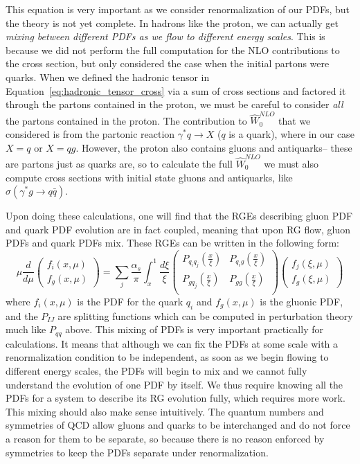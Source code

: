 \documentclass[11pt, oneside]{article}   	%
\theoremstyle{definition}
\begin{document}
This equation is very important as we consider renormalization of our PDFs, but the theory is not yet complete. In hadrons like the proton, we can 
actually get \textit{mixing between different PDFs as we flow to different energy scales}. This is because we did not perform the full 
computation for the NLO contributions to the cross section, but only considered the case when the initial partons were quarks. When we defined 
the hadronic tensor in Equation~\ref{eq:hadronic_tensor_cross} via a sum of cross sections and factored it through the partons contained in 
the proton, we must be careful to consider \textit{all} the partons contained in the proton. The contribution to $\hat{W}_0^{NLO}$ that we considered 
is from the partonic reaction $\gamma^* q\rightarrow X$ ($q$ is a quark), where in our case $X = q$ or $X = qg$. However, the proton also 
contains gluons and antiquarks-- these are partons just as quarks are, so to calculate the full $\hat{W}_0^{NLO}$ we must also compute cross 
sections with initial state gluons and antiquarks, like $\sigma(\gamma^* g\rightarrow q\bar q)$. 

Upon doing these calculations, one will find that the RGEs describing gluon PDF and quark PDF evolution are in fact coupled, meaning 
that upon RG flow, gluon PDFs and quark PDFs mix. These RGEs can be written in the following form:
\begin{equation}
	\mu\frac{d}{d\mu}\begin{pmatrix} f_i(x, \mu) \\ f_g(x, \mu)\end{pmatrix}
	= 
	\sum_j\frac{\alpha_s}{\pi}\int_x^1\frac{d\xi}{\xi}
	\begin{pmatrix}
		P_{q_i q_j}\left(\frac{x}{\xi}\right) & P_{q_i g}\left(\frac{x}{\xi}\right) \\
		P_{g q_j}\left(\frac{x}{\xi}\right) & P_{g g}\left(\frac{x}{\xi}\right) \\
	\end{pmatrix}
	\begin{pmatrix}
		f_j(\xi, \mu) \\ f_g(\xi, \mu)
	\end{pmatrix}
\end{equation}
where $f_i(x, \mu)$ is the PDF for the quark $q_i$ and $f_g(x, \mu)$ is the gluonic PDF, and the $P_{IJ}$ are splitting functions which can be 
computed in perturbation theory much like $P_{qq}$ above. This mixing of PDFs is very important practically for 
calculations. It means that although we can fix the PDFs at some scale with a renormalization condition to be independent, as soon as we 
begin flowing to different energy scales, the PDFs will begin to mix and we cannot fully understand the evolution of one PDF by itself. 
We thus require knowing all the PDFs for a system to describe its RG evolution fully, which requires more work. This mixing should also make 
sense intuitively. The quantum numbers and symmetries of QCD allow gluons and quarks to be interchanged and do not force a reason for them to 
be separate, so because there is no reason enforced by symmetries to keep the PDFs separate under renormalization. 
\end{document}

